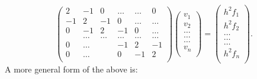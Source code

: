 \documentclass[11pt,a4wide]{article}
\begin{document}
\begin{equation}
     \left(\begin{array}{cccccc}
                           2& -1& 0 &\dots   & \dots &0 \\
                           -1 & 2 & -1 &0 &\dots &\dots \\
                           0&-1 &2 & -1 & 0 & \dots \\
                           & \dots   & \dots &\dots   &\dots & \dots \\
                           0&\dots   &  &-1 &2& -1 \\
                           0&\dots    &  & 0  &-1 & 2 \\
                      \end{array} \right)\left(\begin{array}{c}
                           v_1\\
                           v_2\\
                           \dots \\
                          \dots  \\
                          \dots \\
                           v_{n}\\
                      \end{array} \right)
  =\left(\begin{array}{c}
                           h^2f_1\\
                           h^2f_2\\
                           \dots \\
                           \dots \\
                          \dots \\
                           h^2f_{n}\\
                      \end{array} \right).
\label{N}\end{equation}
A more general form of the above is:
\end{document}
